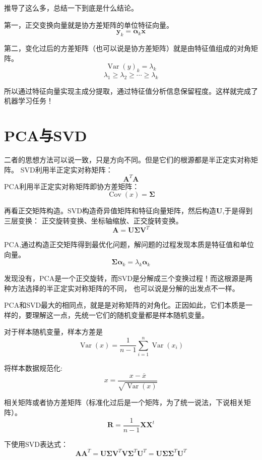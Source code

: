 \documentclass{article}
\begin{document}
    推导了这么多，总结一下到底是什么结论。

    第一，正交变换向量就是协方差矩阵的单位特征向量。
    \[\boldsymbol{y}_k=\boldsymbol{\alpha}_k\boldsymbol{x}\]

    第二，变化过后的方差矩阵（也可以说是协方差矩阵）就是由特征值组成的对角矩阵。
    \[\operatorname{Var}(y)_k=\lambda_k\]
    \[\lambda_1\ge\lambda_2\ge\cdots\ge\lambda_k\]

    所以通过特征向量实现主成分提取，通过特征值分析信息保留程度。这样就完成了机器学习任务！

    \section{PCA与SVD}
    二者的思想方法可以说一致，只是方向不同。但是它们的根源都是半正定实对称矩阵。
    SVD利用半正定实对称矩阵：
    \[\boldsymbol{A}^T\boldsymbol{A}\]
    PCA利用半正定实对称矩阵即协方差矩阵：
    \[\operatorname{Cov}(x)=\boldsymbol{\Sigma}\]

    再看正交矩阵构造。SVD构造奇异值矩阵和特征向量矩阵，然后构造$\boldsymbol{U}$,于是得到三层变换：
    正交旋转变换、坐标轴缩放、正交旋转变换。
    \[\boldsymbol{A}=\boldsymbol{U}\boldsymbol{\Sigma}\boldsymbol{V}^T\]

    PCA,通过构造正交矩阵得到最优化问题，解问题的过程发现本质是特征值和单位向量。
    \[\boldsymbol{\Sigma}\boldsymbol{\alpha}_k=\lambda_k\boldsymbol{\alpha}_k\]

    发现没有，PCA是一个正交旋转，而SVD是分解成三个变换过程！而这根源是两种方法选择的半正定实对称矩阵的不同，
    也可以说是分解的出发点不一样。  

    PCA和SVD最大的相同点，就是是对称矩阵的对角化。正因如此，它们本质是一样的，要理解这一点，先统一它们的随机变量都是样本随机变量。

    对于样本随机变量，样本方差是
    \[\operatorname{Var}(x)=\frac{1}{n-1}\sum_{i=1}^{n}\operatorname{Var}(x_i)\]

    将样本数据规范化:
    \[x=\frac{x-\overline{x} }{\sqrt{\operatorname{Var}(x)}}\]

    相关矩阵或者协方差矩阵（标准化过后是一个矩阵，为了统一说法，下说相关矩阵）。
    \[\boldsymbol{R}=\frac{1}{n-1}\boldsymbol{X}\boldsymbol{X}^t\]

    下使用SVD表达式：
    \[\boldsymbol{A}\boldsymbol{A}^T=\boldsymbol{U}\boldsymbol{\Sigma}\boldsymbol{V}^T\boldsymbol{V}\boldsymbol{\Sigma}^T\boldsymbol{U}^T=\boldsymbol{U}\boldsymbol{\Sigma}\boldsymbol{\Sigma}^T\boldsymbol{U}^T\]
\end{document}

